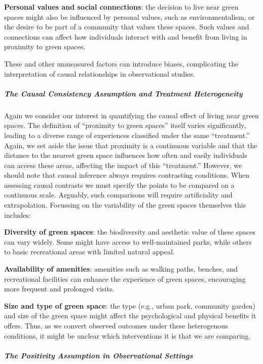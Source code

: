 \documentclass[
  singlecolumn]{article}
\let\oldsubparagraph\subparagraph
\renewcommand{\subparagraph}[1]{\oldsubparagraph{#1}\mbox{}}
\begin{document}
\textbf{Personal values and social connections}: the decision to live
near green spaces might also be influenced by personal values, such as
environmentalism, or the desire to be part of a community that values
these spaces. Such values and connections can affect how individuals
interact with and benefit from living in proximity to green spaces.

These and other unmeasured factors can introduce biases, complicating
the interpretation of causal relationships in observational studies.

\subparagraph{The Causal Consistency Assumption and Treatment
Heterogeneity}\label{the-causal-consistency-assumption-and-treatment-heterogeneity}

Again we consider our interest in quantifying the causal effect of
living near green spaces. The definition of ``proximity to green
spaces'' itself varies significantly, leading to a diverse range of
experiences classified under the same ``treatment.'' Again, we set aside
the issue that proximity is a continuous variable and that the distance
to the nearest green space influences how often and easily individuals
can access these areas, affecting the impact of this ``treatment.''
However, we should note that causal inference always requires
contrasting conditions. When assessing causal contrasts we must specify
the points to be compared on a continuous scale. Arguably, such
comparisons will require artificiality and extrapolation. Focussing on
the variability of the green spaces themselves this includes:

\textbf{Diversity of green spaces}: the biodiversity and aesthetic value
of these spaces can vary widely. Some might have access to
well-maintained parks, while others to basic recreational areas with
limited natural appeal.

\textbf{Availability of amenities}: amenities such as walking paths,
benches, and recreational facilities can enhance the experience of green
spaces, encouraging more frequent and prolonged visits.

\textbf{Size and type of green space}: the type (e.g., urban park,
community garden) and size of the green space might affect the
psychological and physical benefits it offers. Thus, as we convert
observed outcomes under these heterogenous conditions, it might be
unclear which interventions it is that we are comparing.

\subparagraph{The Positivity Assumption in Observational
Settings}\label{the-positivity-assumption-in-observational-settings}
\end{document}
